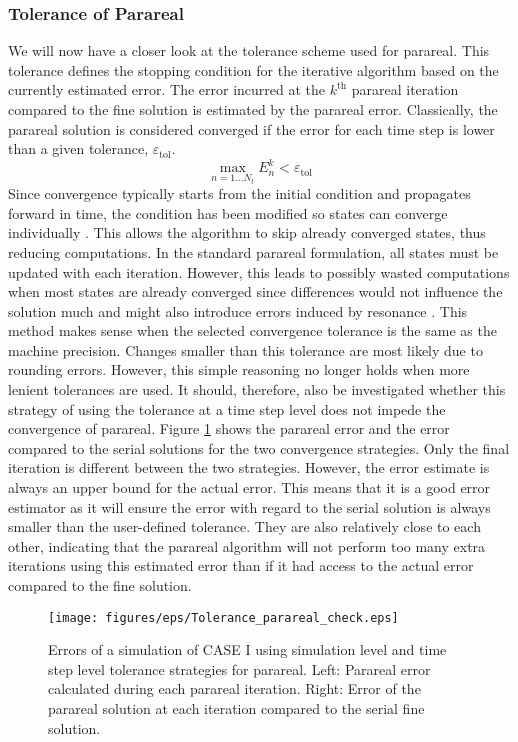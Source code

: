 \subsubsection{Tolerance of Parareal}
\label{sub: tol parareal}
We will now have a closer look at the tolerance scheme used for parareal. This tolerance defines the stopping condition for the iterative algorithm based on the currently estimated error.
The error incurred at the $k^\mathrm{th}$  parareal iteration compared to the fine solution is estimated by the parareal error. Classically, the parareal solution is considered converged if the error for each time step is lower than a given tolerance, $\varepsilon_\mathrm{tol}$. \[
    \max_{n =1...N_t}E^k_n < \varepsilon_\mathrm{tol}
\] 
Since convergence typically starts from the initial condition and propagates forward in time, the condition has been modified so states can converge individually \cite{d_samaddar_parallelization_2010}. This allows the algorithm to skip already converged states, thus reducing computations. In the standard parareal formulation, all states must be updated with each iteration. However, this leads to possibly wasted computations when most states are already converged since differences would not influence the solution much and might also introduce errors induced by resonance \cite{d_samaddar_parallelization_2010}. This method makes sense when the selected convergence tolerance is the same as the machine precision. Changes smaller than this tolerance are most likely due to rounding errors. However, this simple reasoning no longer holds when more lenient tolerances are used. It should, therefore, also be investigated whether this strategy of using the tolerance at a time step level does not impede the convergence of parareal. Figure \ref{fig: CN-parareal-convergence-tolerance} shows the parareal error and the error compared to the serial solutions for the two convergence strategies. Only the final iteration is different between the two strategies. However, the error estimate is always an upper bound for the actual error. This means that it is a good error estimator as it will ensure the error with regard to the serial solution is always smaller than the user-defined tolerance. They are also relatively close to each other, indicating that the parareal algorithm will not perform too many extra iterations using this estimated error than if it had access to the actual error compared to the fine solution.
\begin{figure}[h]
    \centering
    \texttt{[image: figures/eps/Tolerance\_parareal\_check.eps]}
    \caption{Errors of a simulation of CASE I using simulation level and time step level tolerance strategies for parareal. Left: Parareal error calculated during each parareal iteration. Right: Error of the parareal solution at each iteration compared to the serial fine solution.}
    \label{fig: CN-parareal-convergence-tolerance}
\end{figure}

